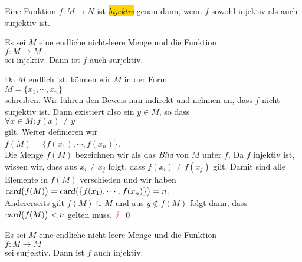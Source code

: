\begin{Definition}[bijektiv] \lb
  Eine Funktion $f: M \rightarrow N$ ist \colorbox{gold}{\emph{bijektiv}} genau dann, wenn
 $f$ sowohl injektiv als auch surjektiv ist.  
\eox
\end{Definition}

\begin{Satz} \label{satz:injektiv_folgt_surjektiv}
  Es sei $M$ eine endliche nicht-leere Menge und die Funktion 
\\[0.2cm]
\hspace*{1.3cm}
$f:M \rightarrow M$
\\[0.2cm]
sei injektiv.  Dann ist $f$ auch surjektiv.
\eox
\end{Satz}

\proof
Da $M$ endlich ist, k\"{o}nnen wir $M$ in der Form
\\[0.2cm]
\hspace*{1.3cm}
$M = \{ x_1, \cdots, x_n \}$
\\[0.2cm]
schreiben.  Wir f\"{u}hren den Beweis nun indirekt und nehmen an, dass $f$ nicht surjektiv ist.  Dann
existiert also ein $y \in M$, so dass
\\[0.2cm]
\hspace*{1.3cm}
$\forall x \in M: f(x) \not = y$
\\[0.2cm]
gilt.  Weiter definieren wir
\\[0.2cm]
\hspace*{1.3cm}
$f(M) = \{f(x_1), \cdots, f(x_n) \}$.
\\[0.2cm]
Die Menge $f(M)$ bezeichnen wir als das \emph{Bild} von $M$ unter $f$.
Da $f$ injektiv ist, wissen wir, dass aus  $x_i \not= x_j$ folgt, dass $f(x_i) \not= f(x_j)$ gilt.
Damit sind alle Elemente in $f(M)$ verschieden und wir haben
\\[0.2cm]
\hspace*{1.3cm}
$\textsl{card}\bigl(f(M)\bigr) = \textsl{card}\bigl(\{f(x_1), \cdots, f(x_n) \}\bigr) = n$.
\\[0.2cm]
Andererseits gilt $f(M) \subseteq M$ und aus $y \not\in f(M)$ folgt dann, dass
\\[0.2cm]
\hspace*{1.3cm}
$\textsl{card}\bigl(f(M)\bigr) < n$ gelten muss. ${\color{red}{\lightning}}$  \qed


\begin{Satz}
  Es sei $M$ eine endliche nicht-leere Menge und die Funktion 
  \\[0.2cm]
  \hspace*{1.3cm}
  $f:M \rightarrow M$
  \\[0.2cm]
  sei surjektiv.  Dann ist $f$ auch injektiv.
\end{Satz}

